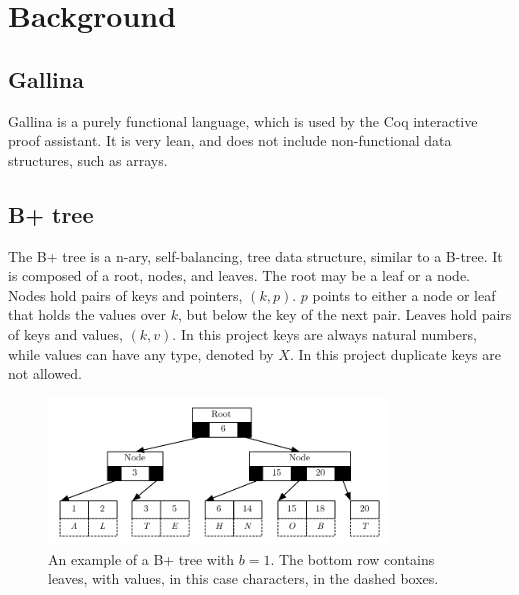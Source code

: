 \section{Background}
\label{sec:Background}

\subsection{Gallina}
Gallina is a purely functional language, which is used by the Coq interactive proof assistant. It is very lean, and does not include non-functional data structures, such as arrays.

\subsection{B+ tree}
\label{subsec:Background_Bplus_tree}
The B+ tree is a n-ary, self-balancing, tree data structure, similar to a B-tree. It is composed of a root, nodes, and leaves. The root may be a leaf or a node. Nodes hold pairs of keys and pointers, $(k, p)$. $p$ points to either a node or leaf that holds the values over $k$, but below the key of the next pair. Leaves hold pairs of keys and values, $(k, v)$. In this project keys are always natural numbers, while values can have any type, denoted by $X$. In this project duplicate keys are not allowed.

\begin{figure}
 \centering
   \includegraphics[width=90mm]{diagrams/BPlusTree.pdf}
 \caption{An example of a B+ tree with $b=1$. The bottom row contains leaves, with values, in this case characters, in the dashed boxes.}
 \label{fig:bplustree}
\end{figure}

